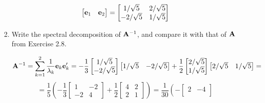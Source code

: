 \begin{enumerate}[font=\bfseries]
\begin{enumerate}
\[\begin{bmatrix}
                    \bold{e}_1 & \bold{e}_2
                \end{bmatrix}
                =
                \begin{bmatrix}
                    1/\sqrt{5} & 2/\sqrt{5} \\
                    -2/\sqrt{5} & 1/\sqrt{5}
                \end{bmatrix}
            \]
            \item Write the spectral decomposition of $\bold{A}^{-1}$, and compare it with that of $\bold{A}$ from Exercise 2.8.
            \par
            \[
                \bold{A}^{-1} = \sum_{k=1}^2{\frac{1}{\lambda_k}\bold{e}_k\bold{e}_k^\prime} = 
                -\frac{1}{3}
                \begin{bmatrix}
                    1/\sqrt{5} \\
                    -2/\sqrt{5}
                \end{bmatrix}
                \begin{bmatrix}
                    1/\sqrt{5} & -2/\sqrt{5}
                \end{bmatrix}
                +
                \frac{1}{2}
                \begin{bmatrix}
                    2/\sqrt{5} \\
                    1/\sqrt{5}
                \end{bmatrix}
                \begin{bmatrix}
                    2/\sqrt{5} & 1/\sqrt{5}
                \end{bmatrix}
                =
            \]
            \[
                =
                \frac{1}{5}
                \left(
                -\frac{1}{3}
                \begin{bmatrix}
                    1 & -2 \\
                    -2 & 4
                \end{bmatrix}
                +
                \frac{1}{2}
                \begin{bmatrix}
                    4 & 2 \\
                    2 & 1
                \end{bmatrix}
                \right)
                =
                \frac{1}{30}
                \left(
                -
                \begin{bmatrix}
                    2 & -4 \\

\end{bmatrix}\]
\end{enumerate}
\end{enumerate}
